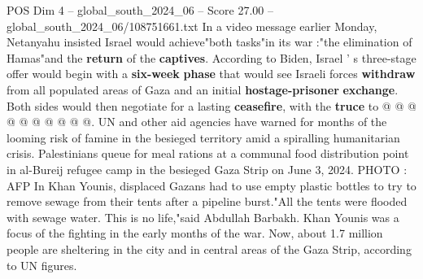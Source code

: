 \begin{textsample}{POS Dim 4 – global\_south\_2024\_06 – Score 27.00 – global\_south\_2024\_06/108751661.txt}
In a video message earlier Monday, Netanyahu insisted Israel would achieve"both tasks"in its war :"the elimination of Hamas"and the \textbf{return} of the \textbf{captives}.
According to Biden, Israel ' s three-stage offer would begin with a \textbf{six-week} \textbf{phase} that would see Israeli forces \textbf{withdraw} from all populated areas of Gaza and an initial \textbf{hostage-prisoner} \textbf{exchange}.
Both sides would then negotiate for a lasting \textbf{ceasefire}, with the \textbf{truce} to @ @ @ @ @ @ @ @ @ @.
UN and other aid agencies have warned for months of the looming risk of famine in the besieged territory amid a spiralling humanitarian crisis.
Palestinians queue for meal rations at a communal food distribution point in al-Bureij refugee camp in the besieged Gaza Strip on June 3, 2024.
PHOTO : AFP In Khan Younis, displaced Gazans had to use empty plastic bottles to try to remove sewage from their tents after a pipeline burst."All the tents were flooded with sewage water.
This is no life,"said Abdullah Barbakh.
Khan Younis was a focus of the fighting in the early months of the war.
Now, about 1.7 million people are sheltering in the city and in central areas of the Gaza Strip, according to UN figures.

\end{textsample}
